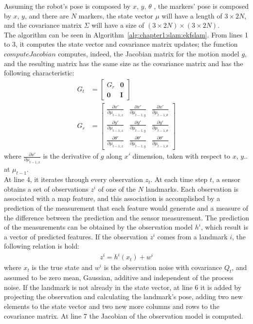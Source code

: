 Assuming the robot's pose is composed by $x$, $y$, $\theta$ , the markers' pose is composed by $x$, $y$, and there are $N$ markers, the state vector $\mu$ will have a length of $3 \times 2N$, and the covariance matrix $\Sigma$ will have a size of $(3 \times 2N) \times (3 \times 2N)$.\\

The algorithm can be seen in Algorithm~\ref{alg:chapter1:slam:ekfslam}. From lines 1 to 3, it computes the state vector and covariance matrix updates; the function $computeJacobian$ computes, indeed, the Jacobian matrix for the motion model $g$, and the resulting matrix has the same size as the covariance matrix and has the following characteristic:
\begin{align}
   G_t &= \begin{bmatrix}
        G_r & \textbf{0} \\
        \textbf{0} & \textbf{I}
    \end{bmatrix}\\
    G_r &= \begin{bmatrix}
    \frac{\partial x'}{\partial \mu_{t-1,x}} & \frac{\partial x'}{\partial \mu_{t-1,y}} & \frac{\partial x'}{\partial \mu_{t-1,\theta}}\\
    \frac{\partial y'}{\partial \mu_{t-1,x}} & \frac{\partial y'}{\partial \mu_{t-1,y}} & \frac{\partial y'}{\partial \mu_{t-1,\theta}}\\
    \frac{\partial \theta'}{\partial \mu_{t-1,x}} & \frac{\partial \theta'}{\partial \mu_{t-1,y}} & \frac{\partial \theta'}{\partial \mu_{t-1,\theta}}
\end{bmatrix}
\end{align}
where $\frac{\partial x'}{\partial \mu_{t-1,x}}$ is the derivative of $g$ along $x'$ dimension, taken with respect to $x$, $y$.. at $\mu_{t-1}$.\\

At line 4, it iterates through every observation $z_t$. At each time step $t$, a sensor obtains a set of observations $z^i$ of one of the $N$ landmarks. Each observation is associated with a map feature, and this association is accomplished by a prediction of the measurement that each feature would generate and a measure of the difference between the prediction and the sensor measurement. The prediction of the measurements can be obtained by the observation model $h^i$, which result is a vector of predicted features. If the observation $z^i$ comes from a landmark $i$, the following relation is hold:
\begin{align}
    z^i = h^i\left(x_t\right) + w^i
\end{align}
where $x_t$ is the true state and $w^i$ is the observation noise with covariance $Q_t$, and assumed to be zero mean, Gaussian, additive and independent of the process noise. If the landmark is not already in the state vector, at line 6 it is added by projecting the observation and calculating the landmark's pose, adding two new elements to the state vector and two new more columns and rows to the covariance matrix. At line 7 the Jacobian of the observation model is computed.\\

